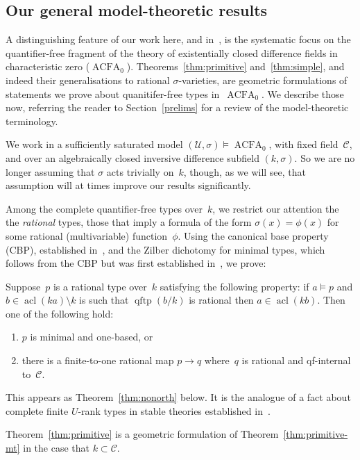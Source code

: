 \documentclass[\DocOpts]{amsart}
\theoremstyle{definition}
\newenvironment{customthm}[1]
  {\renewcommand\theinnercustomthm{#1}\innercustomthm}
  {\endinnercustomthm}
\def\acfa{\operatorname{ACFA}}
\def\qftp{\operatorname{qftp}}
\def\acl{\operatorname{acl}}
\def\C{\mathcal{C}}
\def\U{\mathcal{U}}
\newcommand{\<}{\langle}
\renewcommand{\>}{\rangle}
\begin{document}
\medskip
\subsection{Our general model-theoretic results}
A distinguishing feature of our work here, and in~\cite{qfint}, is the systematic focus on the quantifier-free fragment of the theory of existentially closed difference fields in characteristic zero ($\acfa_0$).
Theorems~\ref{thm:primitive} and~\ref{thm:simple}, and indeed their generalisations to rational $\sigma$-varieties, 
are geometric formulations of statements we prove about quanitifer-free types in~$\acfa_0$.
We describe those now, referring the reader to Section~\ref{prelims} for a review of the model-theoretic terminology.

We work in a sufficiently saturated model $(\U,\sigma)\models\acfa_0$, with fixed field~$\C$, and over an algebraically closed inversive difference subfield $(k,\sigma)$.
So we are no longer assuming that $\sigma$ acts trivially on~$k$, though, as we will see, that assumption will at times improve our results significantly.

Among the complete quantifier-free types over~$k$, we restrict our attention the the {\em rational} types, those that imply a formula of the form $\sigma(x)=\phi(x)$ for some rational (multivariable) function~$\phi$.
Using the canonical base property (CBP), established in~\cite{pillay-ziegler}, and the Zilber dichotomy for minimal types, which follows from the CBP but was first established in~\cite{acfa}, we prove:

\begin{customthm}{4}
\label{thm:primitive-mt}
Suppose~$p$ is a rational type over~$k$ satisfying the following property:
if $a\models p$ and $b\in\acl(ka)\setminus k$ is such that $\qftp(b/k)$ is rational then $a\in\acl(kb)$.
Then one of the following hold:
\begin{enumerate}
\item
$p$ is minimal and one-based, or
\item
there is a finite-to-one 
rational map $p\to q$ where~$q$ is rational and qf-internal to~$\C$.
\end{enumerate}
\end{customthm}

This appears as Theorem~\ref{thm:nonorth} below.
It is the analogue of a fact about complete finite $U$-rank types in stable theories established in~\cite[Proposition~2.3]{moosa-pillay2014}.

Theorem~\ref{thm:primitive} is a geometric formulation of Theorem~\ref{thm:primitive-mt} in the case that $k\subset\C$.
\end{document}
